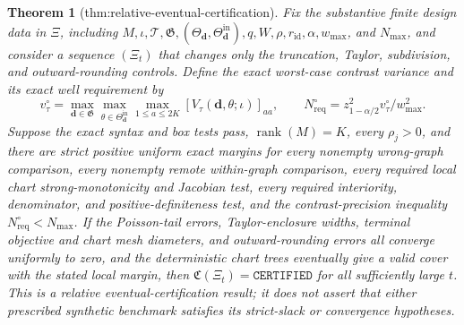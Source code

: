 \documentclass{article}
\newtheorem{theorem}{Theorem}
\begin{document}
\begin{theorem}[thm:relative-eventual-certification]\label{thm:relative-eventual-certification}
Fix the substantive finite design data in \(\Xi\), including \(M,\iota,\mathcal T,\mathfrak G,(\Theta_{\boldsymbol d},\Theta^{\mathrm{in}}_{\boldsymbol d}),q,W,\rho,r_{\mathrm{id}},\alpha,w_{\max}\), and \(N_{\max}\), and consider a sequence \((\Xi_t)\) that changes only the truncation, Taylor, subdivision, and outward-rounding controls.  Define the exact worst-case contrast variance and its exact well requirement by
\[
 v_\tau^\circ=\max_{\boldsymbol d\in\mathfrak G}
 \max_{\theta\in\Theta^{\mathrm{in}}_{\boldsymbol d}}
 \max_{1\leq a\leq2K}
 [V_\tau(\boldsymbol d,\theta;\iota)]_{aa},
 \qquad
 N_{\mathrm{req}}^\circ=
 z_{1-\alpha/2}^2v_\tau^\circ/w_{\max}^2.
\]
Suppose the exact syntax and box tests pass, \(\operatorname{rank}(M)=K\), every \(\rho_j>0\), and there are strict positive uniform exact margins for every nonempty wrong-graph comparison, every nonempty remote within-graph comparison, every required local chart strong-monotonicity and Jacobian test, every required interiority, denominator, and positive-definiteness test, and the contrast-precision inequality \(N_{\mathrm{req}}^\circ<N_{\max}\).  If the Poisson-tail errors, Taylor-enclosure widths, terminal objective and chart mesh diameters, and outward-rounding errors all converge uniformly to zero, and the deterministic chart trees eventually give a valid cover with the stated local margin, then \(\mathfrak C(\Xi_t)=\mathtt{CERTIFIED}\) for all sufficiently large \(t\).  This is a relative eventual-certification result; it does not assert that either prescribed synthetic benchmark satisfies its strict-slack or convergence hypotheses.
\end{theorem}
\end{document}
